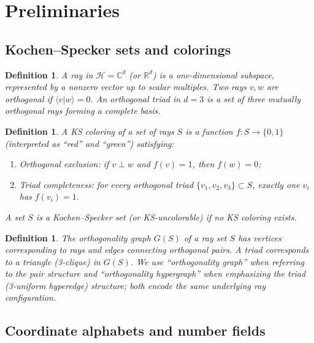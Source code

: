 \documentclass[12pt,a4paper]{article}
\newtheorem{definition}[theorem]{Definition}
\newcommand{\R}{\mathbb{R}}
\newcommand{\C}{\mathbb{C}}
\newcommand{\braket}[2]{\langle#1|#2\rangle}
\begin{document}
\section{Preliminaries}\label{sec:prelim}

\subsection{Kochen--Specker sets and colorings}

\begin{definition}
A \emph{ray} in $\mathcal{H} = \C^d$ (or $\R^d$) is a one-dimensional subspace, represented by a nonzero vector up to scalar multiples. Two rays $v, w$ are \emph{orthogonal} if $\braket{v}{w} = 0$. An \emph{orthogonal triad} in $d = 3$ is a set of three mutually orthogonal rays forming a complete basis.
\end{definition}

\begin{definition}
A \emph{KS coloring} of a set of rays $S$ is a function $f: S \to \{0, 1\}$ (interpreted as ``red'' and ``green'') satisfying:
\begin{enumerate}[label=(\alph*)]
    \item \emph{Orthogonal exclusion}: if $v \perp w$ and $f(v) = 1$, then $f(w) = 0$;
    \item \emph{Triad completeness}: for every orthogonal triad $\{v_1, v_2, v_3\} \subset S$, exactly one $v_i$ has $f(v_i) = 1$.
\end{enumerate}
A set $S$ is a \emph{Kochen--Specker set} (or \emph{KS-uncolorable}) if no KS coloring exists.
\end{definition}

\begin{definition}
The \emph{orthogonality graph} $G(S)$ of a ray set $S$ has vertices corresponding to rays and edges connecting orthogonal pairs. A \emph{triad} corresponds to a triangle (3-clique) in $G(S)$. We use ``orthogonality graph'' when referring to the pair structure and ``orthogonality hypergraph'' when emphasizing the triad (3-uniform hyperedge) structure; both encode the same underlying ray configuration.
\end{definition}

\subsection{Coordinate alphabets and number fields}
\end{document}
